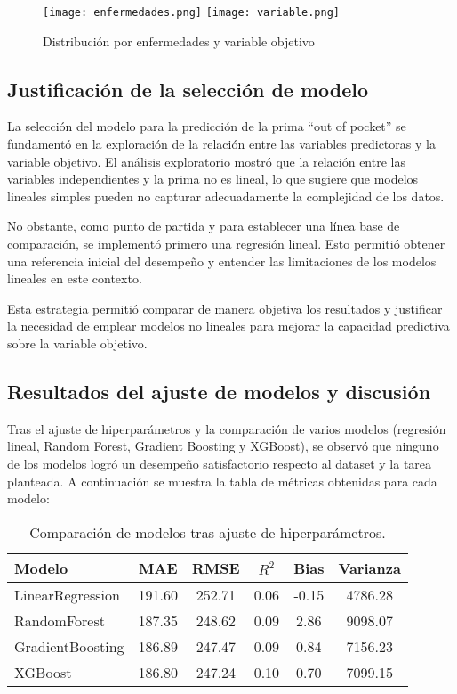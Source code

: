 \documentclass[12pt]{article}
\begin{document}
\begin{figure}[h!]
    \centering
    \texttt{[image: enfermedades.png]}
    \vspace{4,0cm}
    \texttt{[image: variable.png]}
    \caption{Distribución por enfermedades y variable objetivo}
\end{figure}

\subsection*{Justificación de la selección de modelo}
La selección del modelo para la predicción de la prima “out of pocket” se fundamentó en la exploración de la relación entre las variables predictoras y la variable objetivo. El análisis exploratorio mostró que la relación entre las variables independientes y la prima no es lineal, lo que sugiere que modelos lineales simples pueden no capturar adecuadamente la complejidad de los datos.

No obstante, como punto de partida y para establecer una línea base de comparación, se implementó primero una regresión lineal. Esto permitió obtener una referencia inicial del desempeño y entender las limitaciones de los modelos lineales en este contexto. 

Esta estrategia permitió comparar de manera objetiva los resultados y justificar la necesidad de emplear modelos no lineales para mejorar la capacidad predictiva sobre la variable objetivo.


\subsection*{Resultados del ajuste de modelos y discusión}
Tras el ajuste de hiperparámetros y la comparación de varios modelos (regresión lineal, Random Forest, Gradient Boosting y XGBoost), se observó que ninguno de los modelos logró un desempeño satisfactorio respecto al dataset y la tarea planteada. A continuación se muestra la tabla de métricas obtenidas para cada modelo:

\begin{table}[h!]
    \centering
    \begin{tabular}{lccccc}
        \toprule
        Modelo & MAE & RMSE & $R^2$ & Bias & Varianza \\
        \midrule
        LinearRegression & 191.60 & 252.71 & 0.06 & -0.15 & 4786.28 \\
        RandomForest & 187.35 & 248.62 & 0.09 & 2.86 & 9098.07 \\
        GradientBoosting & 186.89 & 247.47 & 0.09 & 0.84 & 7156.23 \\
        XGBoost & 186.80 & 247.24 & 0.10 & 0.70 & 7099.15 \\
        \bottomrule
    \end{tabular}
    \caption{Comparación de modelos tras ajuste de hiperparámetros.}
\end{table}
\end{document}
